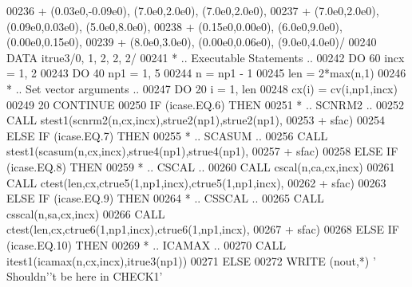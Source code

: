 \begin{DoxyCode}
00236      +                  (0.03e0,-0.09e0), (7.0e0,2.0e0), (7.0e0,2.0e0),
00237      +                  (7.0e0,2.0e0), (0.09e0,0.03e0), (5.0e0,8.0e0),
00238      +                  (0.15e0,0.00e0), (6.0e0,9.0e0), (0.00e0,0.15e0),
00239      +                  (8.0e0,3.0e0), (0.00e0,0.06e0), (9.0e0,4.0e0)/
00240       \textcolor{keyword}{DATA}              itrue3/0, 1, 2, 2, 2/
00241 \textcolor{comment}{*     .. Executable Statements ..}
00242       \textcolor{keywordflow}{DO} 60 incx = 1, 2
00243          \textcolor{keywordflow}{DO} 40 np1 = 1, 5
00244             n = np1 - 1
00245             len = 2*max(n,1)
00246 \textcolor{comment}{*           .. Set vector arguments ..}
00247             \textcolor{keywordflow}{DO} 20 i = 1, len
00248                cx(i) = cv(i,np1,incx)
00249    20       \textcolor{keywordflow}{CONTINUE}
00250             \textcolor{keywordflow}{IF} (icase.EQ.6) \textcolor{keywordflow}{THEN}
00251 \textcolor{comment}{*              .. SCNRM2 ..}
00252                \textcolor{keyword}{CALL }stest1(scnrm2(n,cx,incx),strue2(np1),strue2(np1),
00253      +                     sfac)
00254             \textcolor{keywordflow}{ELSE} \textcolor{keywordflow}{IF} (icase.EQ.7) \textcolor{keywordflow}{THEN}
00255 \textcolor{comment}{*              .. SCASUM ..}
00256                \textcolor{keyword}{CALL }stest1(scasum(n,cx,incx),strue4(np1),strue4(np1),
00257      +                     sfac)
00258             \textcolor{keywordflow}{ELSE} \textcolor{keywordflow}{IF} (icase.EQ.8) \textcolor{keywordflow}{THEN}
00259 \textcolor{comment}{*              .. CSCAL ..}
00260                \textcolor{keyword}{CALL }cscal(n,ca,cx,incx)
00261                \textcolor{keyword}{CALL }ctest(len,cx,ctrue5(1,np1,incx),ctrue5(1,np1,incx),
00262      +                    sfac)
00263             \textcolor{keywordflow}{ELSE} \textcolor{keywordflow}{IF} (icase.EQ.9) \textcolor{keywordflow}{THEN}
00264 \textcolor{comment}{*              .. CSSCAL ..}
00265                \textcolor{keyword}{CALL }csscal(n,sa,cx,incx)
00266                \textcolor{keyword}{CALL }ctest(len,cx,ctrue6(1,np1,incx),ctrue6(1,np1,incx),
00267      +                    sfac)
00268             \textcolor{keywordflow}{ELSE} \textcolor{keywordflow}{IF} (icase.EQ.10) \textcolor{keywordflow}{THEN}
00269 \textcolor{comment}{*              .. ICAMAX ..}
00270                \textcolor{keyword}{CALL }itest1(icamax(n,cx,incx),itrue3(np1))
00271             \textcolor{keywordflow}{ELSE}
00272                \textcolor{keyword}{WRITE} (nout,*) \textcolor{stringliteral}{' Shouldn'}\textcolor{stringliteral}{'t be here in CHECK1'}

\end{DoxyCode}
